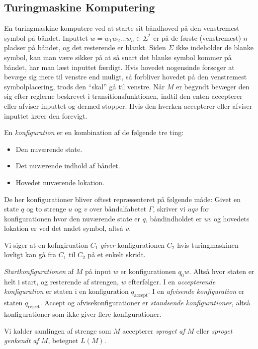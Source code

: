 \subsection{Turingmaskine Komputering}%
\label{subsec:turingmaskinekomputering}

En turingmaskine komputere ved at starte sit båndhoved på den venstremest symbol på båndet. Inputtet $w = w_{1}w_{2} \ldots w_{n} \in \Sigma^{*}$ er på de første (venstremest) $n$ pladser på båndet, og det resterende er blankt. Siden $\Sigma$ ikke indeholder de blanke symbol, kan man være sikker på at så snart det blanke symbol kommer på båndet, har man læst inputtet færdigt. Hvis hovedet nogensinde forsøger at bevæge sig mere til venstre end muligt, så forbliver hovedet på den venstremest symbolplacering, trods den ``skal'' gå til venstre. Når $M$ er begyndt bevæger den sig efter reglerne beskrevet i transitionsfunktionen, indtil den enten accepterer eller afviser inputtet og dermed stopper. Hvis den hverken accepterer eller afviser inputtet kører den forevigt.

En \textit{konfiguration} er en kombination af de følgende tre ting:
\begin{itemize}
  \item Den nuværende state.
  \item Det nuværende indhold af båndet.
  \item Hovedet nuværende lokation.
\end{itemize}

De her konfigurationer bliver oftest repræsenteret på følgende måde: Givet en state $q$ og to strenge $u$ og $v$ over båndalfabetet $\Gamma$, skriver vi $uqv$ for konfigurationen hvor den nuværende state er $q$, båndindholdet er $uv$ og hovedets lokation er ved det andet symbol, altså $v$.

Vi siger at en kofngiruation $C_{1}$ \textit{giver} konfigurationen $C_{2}$ hvis turingmaskinen lovligt kan gå fra $C_{1}$ til $C_{2}$ på et enkelt skridt.

\textit{Startkonfigurationen} af $M$ på input $w$ er konfigurationen $q_{0}w$. Altså hvor staten er helt i start, og resterende af strengen, $w$ efterfølger. I en \textit{accepterende konfiguration} er staten i en konfiguration $q_{\text{accept}}$. I en \textit{afvisende konfiguration} er staten $q_{\text{reject}}$. Accept og afvisekonfigurationer er \textit{standsende konfigurationer}, altså konfigurationer som ikke giver flere konfigurationer.

Vi kalder samlingen af strenge som $M$ accepterer \textit{sproget af $M$} eller \textit{sproget genkendt af $M$}, betegnet $L(M)$.

